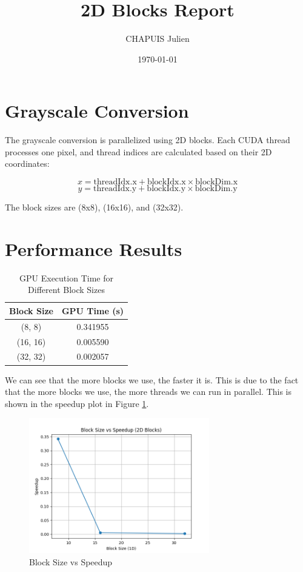 \documentclass{article}
\title{2D Blocks Report}
\author{CHAPUIS Julien}
\date{\today}
\begin{document}
\section{Grayscale Conversion}
The grayscale conversion is parallelized using 2D blocks. Each CUDA thread processes one pixel, and thread indices are calculated based on their 2D coordinates:

\[
x = \text{threadIdx.x} + \text{blockIdx.x} \times \text{blockDim.x}
\]
\[
y = \text{threadIdx.y} + \text{blockIdx.y} \times \text{blockDim.y}
\]

The block sizes are (8x8), (16x16), and (32x32).

\section{Performance Results}

\begin{table}[h]
\centering
\begin{tabular}{|c|c|}
\hline
\textbf{Block Size} & \textbf{GPU Time (s)} \\
\hline
(8, 8)   & 0.341955 \\
(16, 16) & 0.005590 \\
(32, 32) & 0.002057 \\
\hline
\end{tabular}
\caption{GPU Execution Time for Different Block Sizes}
\label{table:performance}
\end{table}

We can see that the more blocks we use, the faster it is. This is due to the fact that the more blocks we use, the more threads we can run in parallel. This is shown in the speedup plot in Figure \ref{fig:speedup_plot}.

\begin{figure}[h]
\centering
\includegraphics[width=0.7\textwidth]{block_size_vs_speedup.png}
\caption{Block Size vs Speedup}
\label{fig:speedup_plot}
\end{figure}
\end{document}
